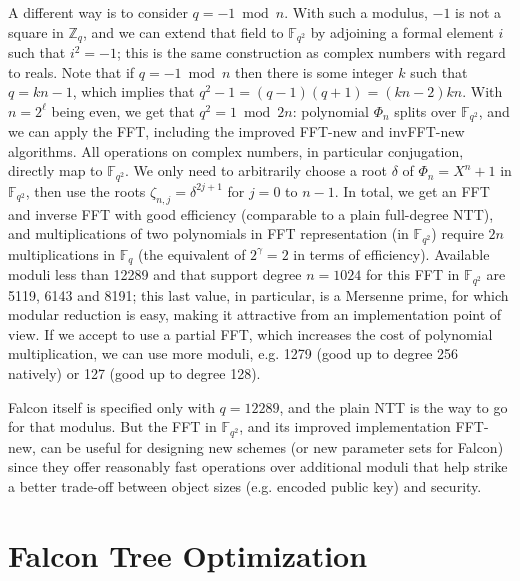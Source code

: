 \documentclass{llncs}
\newcommand{\bF}{\mathbb{F}}
\newcommand{\bZ}{\mathbb{Z}}
\begin{document}
A different way is to consider $q = -1 \bmod n$. With such a modulus,
$-1$ is not a square in $\bZ_q$, and we can extend that field to
$\bF_{q^2}$ by adjoining a formal element $i$ such that $i^2 = -1$; this
is the same construction as complex numbers with regard to reals. Note
that if $q = -1 \bmod n$ then there is some integer $k$ such that $q =
kn - 1$, which implies that $q^2 - 1 = (q - 1)(q + 1) = (kn - 2)kn$.
With $n = 2^\ell$ being even, we get that $q^2 = 1 \bmod 2n$: polynomial
$\Phi_n$ splits over $\bF_{q^2}$, and we can apply the FFT, including
the improved \textsf{FFT-new} and \textsf{invFFT-new} algorithms. All
operations on complex numbers, in particular conjugation, directly map
to $\bF_{q^2}$. We only need to arbitrarily choose a root $\delta$ of
$\Phi_n = X^n + 1$ in $\bF_{q^2}$, then use the roots $\zeta_{n,j} =
\delta^{2j+1}$ for $j = 0$ to $n - 1$. In total, we get an FFT and
inverse FFT with good efficiency (comparable to a plain full-degree
NTT), and multiplications of two polynomials in FFT representation (in
$\bF_{q^2}$) require $2n$ multiplications in $\bF_q$ (the equivalent of
$2^\gamma = 2$ in terms of efficiency). Available moduli less than 12289
and that support degree $n = 1024$ for this FFT in $\bF_{q^2}$ are 5119,
6143 and 8191; this last value, in particular, is a Mersenne prime, for
which modular reduction is easy, making it attractive from an
implementation point of view. If we accept to use a partial FFT, which
increases the cost of polynomial multiplication, we can use more moduli,
e.g. 1279 (good up to degree 256 natively) or 127 (good up to degree
128).

Falcon itself is specified only with $q = 12289$, and the plain NTT is
the way to go for that modulus. But the FFT in $\bF_{q^2}$, and its
improved implementation \textsf{FFT-new}, can be useful for designing
new schemes (or new parameter sets for Falcon) since they offer
reasonably fast operations over additional moduli that help strike a
better trade-off between object sizes (e.g. encoded public key) and
security.


\newpage
\section{Falcon Tree Optimization}\label{sec:tree}
\end{document}
